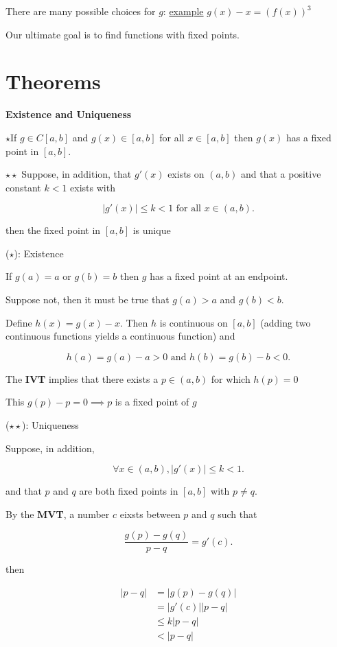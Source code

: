 There are many possible choices for $g$: 
\uline{example} $g(x) -x = \left( f(x) \right)^3$

Our ultimate goal is to find functions with fixed points.

\section{Theorems}

\textbf{Existence and Uniqueness}

$\star$If $g\in C[a,b]$ and $g(x) \in [a, b]$ for all $x\in [a, b]$ then $g(x)$ has a
fixed point in $[a, b]$.

$\star\star$ Suppose, in addition, that $g'(x)$ exists on $(a, b)$ and that a
positive constant $k<1$ exists with 

\[
|g'(x)| \leq k < 1 \text{ for all } x \in (a, b)
.\]

then the fixed point in $[a, b]$ is unique

\proof($\star$): Existence

If $g(a) = a$ or $g(b) = b$ then $g$ has a fixed point at an 
endpoint.

Suppose not, then it must be true that $g(a) > a$ and $g(b) < b$.

Define $h(x) = g(x) - x$. Then $h$ is continuous on $[a, b]$ (adding two
continuous functions yields a continuous function) and

\[
h(a) = g(a) -a > 0 \text{ and } h(b) = g(b) - b < 0
.\]

The \textbf{IVT} implies that there exists a $p \in (a, b)$ for which $h(p) = 0$

This $g(p) - p = 0 \implies p$ is a fixed point of $g$

\proof($\star\star$): Uniqueness

Suppose, in addition,

\[
\forall x \in (a,b), |g'(x)| \leq k < 1
.\]

and that $p$ and $q$ are both fixed points in $[a, b]$ with $p \ne q$.

By the \textbf{MVT}, a number $c$ eixsts between $p$ and $q$ such that

\[
\frac{g(p) - g(q)}{p-q} = g'(c)
.\]

then 

\begin{align*}
  |p-q| &= |g(p) - g(q)| \\
  &= |g'(c)||p-q| \\
  &\leq k|p-q| \\
  &< |p-q|  \\
\end{align*}

